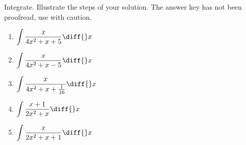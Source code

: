 Integrate. Illustrate the steps of your solution. The answer key has not been proofread, use with caution.
\begin{multicols}{2}
\begin{enumerate}
\item $\displaystyle \int \frac{x}{4x^2+x+5}\diff {}x$

\item $\displaystyle \int \frac{x}{4x^2+x-5}\diff {}x$
\item $\displaystyle \int \frac{x}{4x^2 +x+ \frac{ 1}{16}}\diff {}x$

\item $\displaystyle \int \frac{x+1}{2x^2+x}\diff {}x$

\item $\displaystyle \int \frac{x}{2x^2+x+1}\diff {}x$


\end{enumerate}
\end{multicols}
